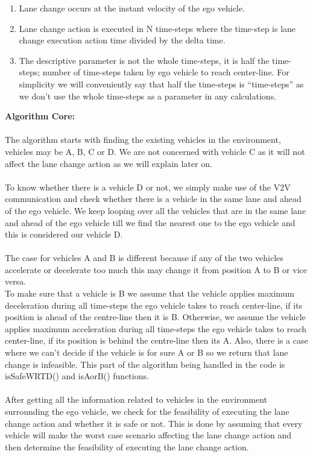 \begin{enumerate}
\item Lane change occurs at the instant velocity of the ego vehicle. 
\item Lane change action is executed in N time-steps where the time-step is lane change execution action time divided by the delta time.
\item The descriptive parameter is not the whole time-steps, it is half the time-steps; number of time-steps taken by ego vehicle to reach center-line. For simplicity we will conveniently say that half the time-steps is “time-steps” as we don’t use the whole time-steps as a parameter in any calculations. 
\end{enumerate}
\textbf{Algorithm Core:}
\\ \\
The algorithm starts with finding the existing vehicles in the environment, vehicles may be A, B, C or D. We are not concerned with vehicle C as it will not affect the lane change action as we will explain later on. \\
\\
To know whether there is a vehicle D or not, we simply make use of the V2V communication and check whether there is a vehicle in the same lane and ahead of the ego vehicle. We keep looping over all the vehicles that are in the same lane and ahead of the ego vehicle till we find the nearest one to the ego vehicle and this is considered our vehicle D. \\
\\
The case for vehicles A and B is different because if any of the two vehicles accelerate or decelerate too much this may change it from position A to B or vice versa.  \\
To make sure that a vehicle is B we assume that the vehicle applies maximum deceleration during all time-steps the ego vehicle takes to reach center-line, if its position is ahead of the centre-line then it is B. Otherwise, we assume the vehicle applies maximum acceleration during all time-steps the ego vehicle takes to reach center-line, if its position is behind the centre-line then its A. Also, there is a case where we can’t decide if the vehicle is for sure A or B so we return that lane change is infeasible. This part of the algorithm being handled in the code is isSafeWRTD() and isAorB() functions. \\
\\
After getting all the information related to vehicles in the environment surrounding the ego vehicle, we check for the feasibility of executing the lane change action and whether it is safe or not. This is done by assuming that every vehicle will make the worst case scenario affecting the lane change action and then determine the feasibility of executing the lane change action. \\
